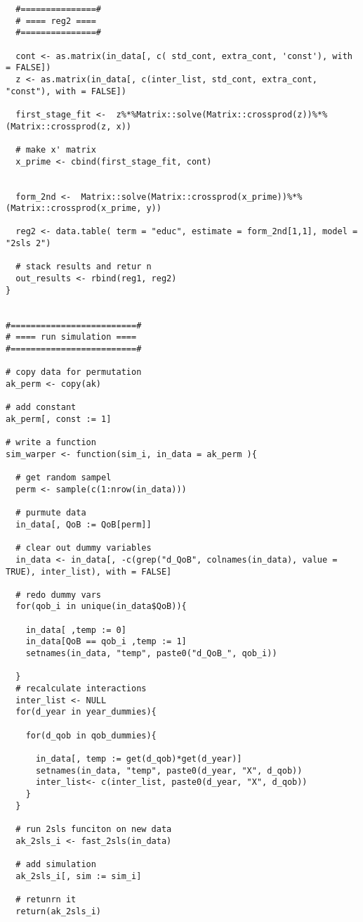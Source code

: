 \documentclass[12pt]{article}
\begin{document}
\begin{verbatim}
  #===============#
  # ==== reg2 ====
  #===============#
  
  cont <- as.matrix(in_data[, c( std_cont, extra_cont, 'const'), with = FALSE])
  z <- as.matrix(in_data[, c(inter_list, std_cont, extra_cont, "const"), with = FALSE])
  
  first_stage_fit <-  z%*%Matrix::solve(Matrix::crossprod(z))%*%(Matrix::crossprod(z, x))
  
  # make x' matrix 
  x_prime <- cbind(first_stage_fit, cont)
  
  
  form_2nd <-  Matrix::solve(Matrix::crossprod(x_prime))%*%(Matrix::crossprod(x_prime, y))
  
  reg2 <- data.table( term = "educ", estimate = form_2nd[1,1], model = "2sls 2")
  
  # stack results and retur n
  out_results <- rbind(reg1, reg2)
}


#=========================#
# ==== run simulation ====
#=========================#

# copy data for permutation 
ak_perm <- copy(ak)

# add constant 
ak_perm[, const := 1]

# write a function 
sim_warper <- function(sim_i, in_data = ak_perm ){
  
  # get random sampel 
  perm <- sample(c(1:nrow(in_data)))
  
  # purmute data 
  in_data[, QoB := QoB[perm]]
  
  # clear out dummy variables 
  in_data <- in_data[, -c(grep("d_QoB", colnames(in_data), value = TRUE), inter_list), with = FALSE]
  
  # redo dummy vars 
  for(qob_i in unique(in_data$QoB)){
    
    in_data[ ,temp := 0]
    in_data[QoB == qob_i ,temp := 1]
    setnames(in_data, "temp", paste0("d_QoB_", qob_i))
    
  }
  # recalculate interactions
  inter_list <- NULL
  for(d_year in year_dummies){
    
    for(d_qob in qob_dummies){
      
      in_data[, temp := get(d_qob)*get(d_year)]
      setnames(in_data, "temp", paste0(d_year, "X", d_qob))
      inter_list<- c(inter_list, paste0(d_year, "X", d_qob))
    }
  }
  
  # run 2sls funciton on new data 
  ak_2sls_i <- fast_2sls(in_data)
  
  # add simulation 
  ak_2sls_i[, sim := sim_i]
  
  # retunrn it 
  return(ak_2sls_i)
  

\end{verbatim}
\end{document}
